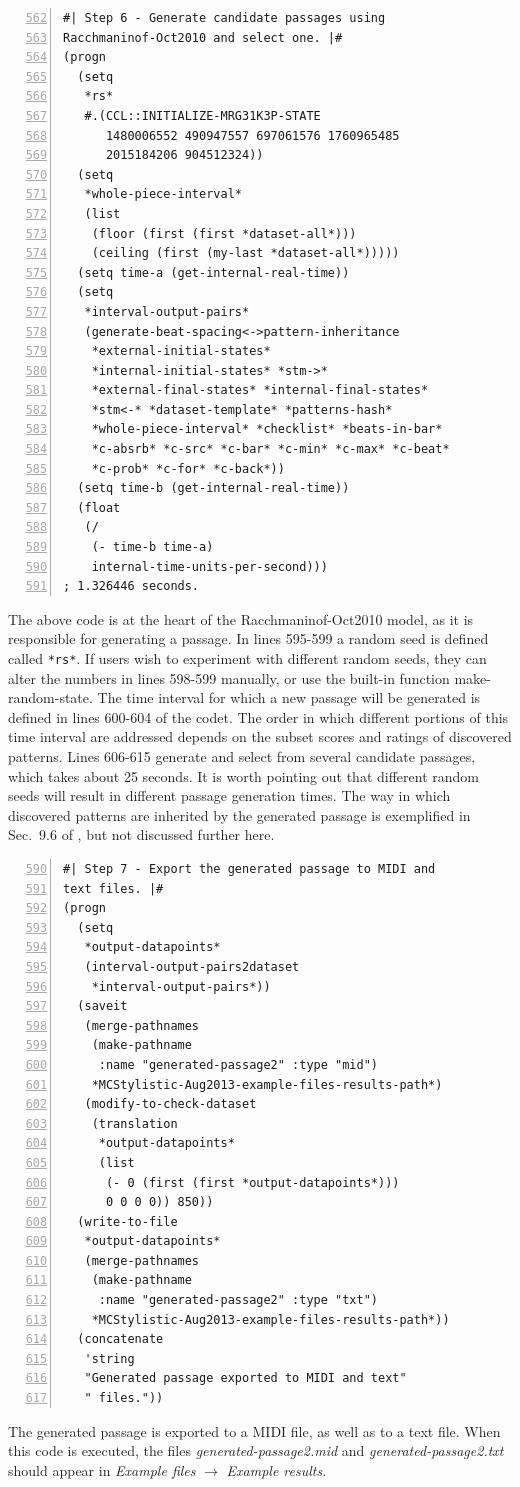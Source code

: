 \begin{Verbatim}[frame=single,numbers=left,firstnumber=562]
#| Step 6 - Generate candidate passages using
Racchmaninof-Oct2010 and select one. |#
(progn
  (setq
   *rs*
   #.(CCL::INITIALIZE-MRG31K3P-STATE
      1480006552 490947557 697061576 1760965485
      2015184206 904512324))
  (setq
   *whole-piece-interval*
   (list
    (floor (first (first *dataset-all*)))
    (ceiling (first (my-last *dataset-all*)))))
  (setq time-a (get-internal-real-time))
  (setq
   *interval-output-pairs*
   (generate-beat-spacing<->pattern-inheritance
    *external-initial-states*
    *internal-initial-states* *stm->*
    *external-final-states* *internal-final-states*
    *stm<-* *dataset-template* *patterns-hash*
    *whole-piece-interval* *checklist* *beats-in-bar*
    *c-absrb* *c-src* *c-bar* *c-min* *c-max* *c-beat*
    *c-prob* *c-for* *c-back*))
  (setq time-b (get-internal-real-time))
  (float
   (/
    (- time-b time-a)
    internal-time-units-per-second)))
; 1.326446 seconds.
\end{Verbatim}
The above code is at the heart of the Racchmaninof-Oct2010 model, as it is responsible for generating a passage. In lines 595-599 a random seed is defined called \texttt{*rs*}. If users wish to experiment with different random seeds, they can alter the numbers in lines 598-599 manually, or use the built-in function make-random-state. The time interval for which a new passage will be generated is defined in lines 600-604 of the codet. The order in which different portions of this time interval are addressed depends on the subset scores and ratings of discovered patterns. Lines 606-615 generate and select from several candidate passages, which takes about 25 seconds. It is worth pointing out that different random seeds will result in different passage generation times. The way in which discovered patterns are inherited by the generated passage is exemplified in Sec.~9.6 of \citet{collins2011b}, but not discussed further here.

\begin{Verbatim}[frame=single,numbers=left,firstnumber=590]
#| Step 7 - Export the generated passage to MIDI and
text files. |#
(progn
  (setq
   *output-datapoints*
   (interval-output-pairs2dataset
    *interval-output-pairs*))
  (saveit
   (merge-pathnames
    (make-pathname
     :name "generated-passage2" :type "mid")
    *MCStylistic-Aug2013-example-files-results-path*)
   (modify-to-check-dataset
    (translation
     *output-datapoints*
     (list
      (- 0 (first (first *output-datapoints*)))
      0 0 0 0)) 850))
  (write-to-file
   *output-datapoints*
   (merge-pathnames
    (make-pathname
     :name "generated-passage2" :type "txt")
    *MCStylistic-Aug2013-example-files-results-path*))
  (concatenate
   'string
   "Generated passage exported to MIDI and text"
   " files."))
\end{Verbatim}
The generated passage is exported to a MIDI file, as well as to a text file. When this code is executed, the files \emph{generated-passage2.mid} and \emph{generated-passage2.txt} should appear in \emph{Example files} $\rightarrow$ \emph{Example results}.

